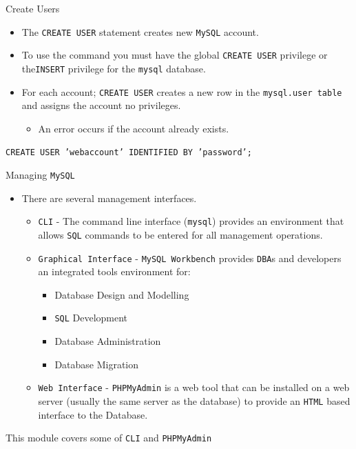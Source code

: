 \documentclass[xcolor=table,aspectratio=169]{beamer}
\begin{document}
\begin{frame}{Create Users}
  \begin{itemize}
    \item The \texttt{CREATE USER} statement creates new \texttt{MySQL} account. 
    \item To use the command you must have the global \texttt{CREATE USER} privilege or the\texttt{INSERT} privilege for the \texttt{mysql} database. 
    \item For each account; \texttt{CREATE USER} creates a new row in the \texttt{mysql.user table} and assigns the account no privileges. 
    \begin{itemize}
      \item An error occurs if the account already exists.
    \end{itemize}
  \end{itemize}
  \begin{tcolorbox}
    \small\texttt{CREATE USER 'webaccount' IDENTIFIED BY 'password';}
  \end{tcolorbox}
\end{frame}

\begin{frame}{Managing \texttt{MySQL}}
  \begin{itemize}
    \item There are several management interfaces.
    \begin{itemize}
      \item \texttt{CLI} - The command line interface (\texttt{mysql}) provides an environment that allows \texttt{SQL} commands to be entered for all management operations.
      \item \texttt{Graphical Interface} - \texttt{MySQL Workbench} provides \texttt{DBA}s and developers an integrated tools environment for:  
        \begin{itemize}
          \item Database Design and Modelling
          \item \texttt{SQL} Development
          \item Database Administration
          \item Database Migration
        \end{itemize}
      \item \texttt{Web Interface} - \texttt{PHPMyAdmin} is a web tool that can be installed on a web server (usually the same server as the database) to provide an \texttt{HTML} based interface to the Database.
    \end{itemize}
  \end{itemize}
  \begin{tcolorbox}
    \begin{center}
      \small This module covers some of \texttt{CLI} and \texttt{PHPMyAdmin}      
    \end{center}
  \end{tcolorbox}
\end{frame}
\end{document}
